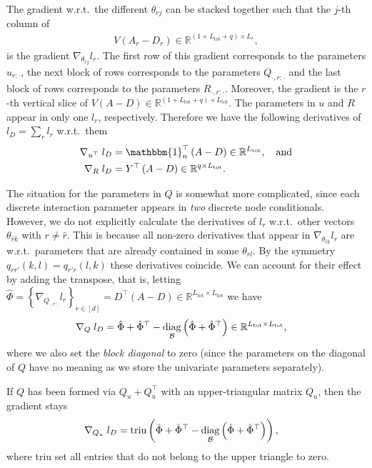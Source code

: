 \documentclass{article}
\def\tot{\text{tot}}
\newcommand{\oneVec}{\mathbbm{1}}
\newcommand{\IR}{{\mathbb{R}}}\newcommand{\IN}{{\mathbb{N}}}
\newcommand{\bPc}[1]{\ensuremath{\left\{#1 \right\}}} %
\newcommand{\bPr}[1]{\ensuremath{\left(#1 \right)}} %
\DeclareMathOperator{\diag}{diag}
\begin{document}
The gradient w.r.t.~the different $\theta_{rj}$ can be stacked together such that the  $j$-th column of
\begin{align*}
V \bPr{A_r - D_r} \in \IR^{(1+L_{\tot}+q) \times L_r},
\end{align*}
is the gradient $\nabla_{\theta_{rj}}l_r$.
The first row of this gradient corresponds to the parameters $u_{r:\cdot}$, the next block of rows corresponds to the parameters $Q_{\cdot, r:\cdot}$ and the last block of rows corresponds to the parameters $R_{\cdot, r:\cdot}$.
Moreover, the gradient is the $r$-th vertical slice of $V \bPr{A - D} \in\IR^{(1+L_{\tot}+q) \times L_{\tot}}$.
The parameters in $u$ and $R$ appear in only one $l_r$, respectively. Therefore
we have the following derivatives of $l_D = \sum_r l_r$ w.r.t.~them
\begin{align*}
\nabla_{u^\top} \;l_D &= \oneVec_n^\top \bPr{A - D} \in\IR^{L_{\tot}},\quad\text{and} \\
\nabla_R \; l_D &= Y^\top \bPr{A - D} \in \IR^{q \times L_{\tot}}.
\end{align*}



The situation for the parameters in $Q$ is somewhat more complicated, since each discrete interaction parameter appears in \emph{two} discrete node conditionals.
However, we do not explicitly calculate the derivatives of $l_r$ w.r.t.~other vectors $\theta_{\hat{r}k}$ with $r\neq\hat{r}$.
This is because all non-zero derivatives that appear in $\nabla_{\theta_{\hat{r}k}} l_r$ are w.r.t.~parameters that are already contained in some $\theta_{rl}$.
By the symmetry $q_{rr'}(k,l)=q_{r'r}(l,k)$ these derivatives coincide.
We can account for their effect by adding the transpose,
that is, letting $\hat{\Phi} = \bPc{\nabla_{Q_{\cdot, r:\cdot}} l_r}_{r\in[d]} = D^\top \bPr{A - D} \in\IR^{L_{\tot} \times L_{\tot}}$ we have 
\begin{align*}
\nabla_Q \; l_D &= \hat{\Phi} + \hat{\Phi}^\top - \diag_\B\bPr{\hat{\Phi} + \hat{\Phi}^\top} \in\IR^{L_{\tot}\times L_{\tot}},
\end{align*}
where we also set the \emph{block diagonal} to zero
(since the parameters on the diagonal of $Q$ have no meaning as we store the univariate parameters separately).

If $Q$ has been formed via $Q_u + Q_u^\top$ with an upper-triangular matrix $Q_u$, then the gradient stays 
\begin{align*}
\nabla_{Q_u} \; l_D &= \text{triu}\bPr{\hat{\Phi} + \hat{\Phi}^\top - \diag_\B\bPr{\hat{\Phi} + \hat{\Phi}^\top} },
\end{align*}
where $\text{triu}$ set all entries that do not belong to the upper triangle to zero.
\end{document}
